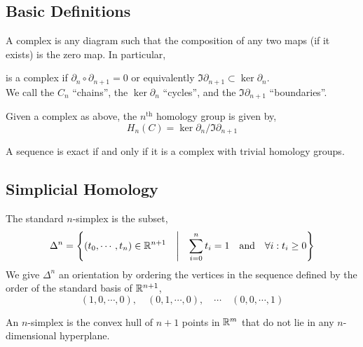 \documentclass[12pt]{extarticle}
\begin{document}
\subsection{Basic Definitions}

\begin{definition}
A complex is any diagram such that the composition of any two maps (if it exists) is the zero map. In particular,
\begin{center}
\end{center}
is a complex if $\partial_{n} \circ \partial_{n + 1} = 0$ or equivalently $\Im{\partial_{n+1}} \subset \ker{\partial_n}$. \bigskip\\
We call the $C_n$ ``chains'', the $\ker{\partial_n}$ ``cycles'', and the $\Im{\partial_{n+1}}$ ``boundaries''. 
\end{definition} 

\begin{definition}
Given a complex as above, the $n^{\mathrm{th}}$ homology group is given by,
\[ H_n(C) = \ker{\partial_n} / \Im{\partial_{n+1}} \]
\end{definition}

\begin{lemma}
A sequence is exact if and only if it is a complex with trivial homology groups.
\end{lemma}

\subsection{Simplicial Homology}

\begin{definition}
The standard $n$-simplex is the subset,
\[\Delta^n = \left\{ (t_0, \cdots, t_n) \in \mathbb{R}^{n+1} \quad \middle| \quad \sum_{i = 0}^n t_i = 1 \quad \text{and} \quad \forall i : t_i \ge 0 \right\} \] 
We give $\Delta^n$ an orientation by ordering the vertices in the sequence defined by the order of the standard basis of $\mathbb{R}^{n+1}$,
\[(1,0, \cdots, 0), \quad (0,1,\cdots,0), \quad \cdots \quad (0, 0, \cdots, 1)\]
\end{definition}

\begin{definition}
An $n$-simplex is the convex hull of $n + 1$ points in $\mathbb{R}^m$ that do not lie in any $n$-dimensional hyperplane. 
\end{definition}
\end{document}
